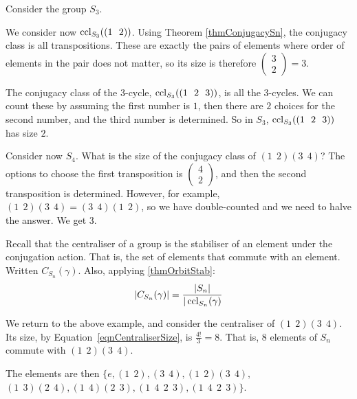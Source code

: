 \documentclass[../Main.tex]{subfiles}
\begin{document}
\begin{example}
Consider the group $S_3$.\par
We consider now $\operatorname{ccl}_{S_3}((1~~2))$. Using Theorem \ref{thmConjugacySn}, the conjugacy class is all transpositions. These are exactly the pairs of elements where order of elements in the pair does not matter, so its size is therefore $\begin{pmatrix}3 \\ 2\end{pmatrix} = 3$.\par
The conjugacy class of the $3$-cycle, $\operatorname{ccl}_{S_3}((1~~2~~3))$, is all the $3$-cycles. We can count these by assuming the first number is $1$, then there are $2$ choices for the second number, and the third number is determined. So in $S_3$, $\operatorname{ccl}_{S_3}((1~~2~~3))$ has size $2$.\par
\end{example}
\begin{example}
    Consider now $S_4$.
    What is the size of the conjugacy class of $(1~~2)(3~~4)$? The options to choose the first transposition is $\begin{pmatrix}4 \\ 2\end{pmatrix}$, and then the second transposition is determined. However, for example, $(1~~2)(3~~4) = (3~~4)(1~~2)$, so we have double-counted and we need to halve the answer. We get $3$.
\end{example}
Recall that the centraliser of a group is the stabiliser of an element under the conjugation action. That is, the set of elements that commute with an element. Written $C_{S_n}(\gamma)$. Also, applying \ref{thmOrbitStab}:
\begin{equation}
|C_{S_n}(\gamma)| = \frac{|S_n|}{|\operatorname{ccl}_{S_n}(\gamma)}
\label{eqnCentraliserSize}
\end{equation}
\begin{example}
We return to the above example, and consider the centraliser of $(1~~2)(3~~4)$. Its size, by Equation~\ref{eqnCentraliserSize}, is $\frac{4!}{3} = 8$. That is, $8$ elements of $S_n$ commute with $(1~~2)(3~~4)$.\par
The elements are then $\{e, (1~~2), (3~~4), (1~~2)(3~~4),$\newline$(1~~3)(2~~4), (1~~4)(2~~3), (1~~4~~2~~3), (1~~4~~2~~3)\}$.
\end{example}
\end{document}
